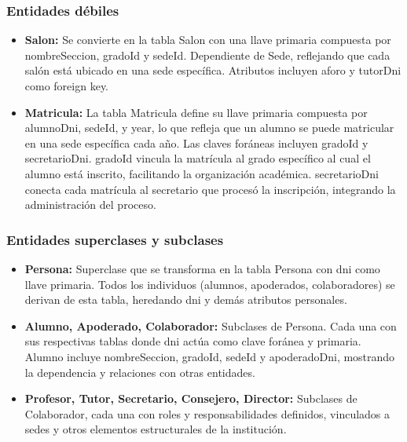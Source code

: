 \subsubsection{Entidades débiles}
\begin{itemize}
	\item \textbf{Salon:} Se convierte en la tabla Salon con una llave primaria compuesta por nombreSeccion, gradoId y sedeId. Dependiente de Sede, reflejando que cada salón está ubicado en una sede específica. Atributos incluyen aforo y tutorDni como foreign key.
	\item \textbf{Matricula:} La tabla Matricula define su llave primaria compuesta por alumnoDni, sedeId, y year, lo que refleja que un alumno se puede matricular en una sede específica cada año. Las claves foráneas incluyen gradoId y secretarioDni. gradoId vincula la matrícula al grado específico al cual el alumno está inscrito, facilitando la organización académica. secretarioDni conecta cada matrícula al secretario que procesó la inscripción, integrando la administración del proceso.
\end{itemize}
\subsubsection{Entidades superclases y subclases}
\begin{itemize}
	\item \textbf{Persona:} Superclase que se transforma en la tabla Persona con dni como llave primaria. Todos los individuos (alumnos, apoderados, colaboradores) se derivan de esta tabla, heredando dni y demás atributos personales.
	\item \textbf{Alumno, Apoderado, Colaborador:} Subclases de Persona. Cada una con sus respectivas tablas donde dni actúa como clave foránea y primaria. Alumno incluye nombreSeccion, gradoId, sedeId y apoderadoDni, mostrando la dependencia y relaciones con otras entidades.
	\item \textbf{Profesor, Tutor, Secretario, Consejero, Director:} Subclases de Colaborador, cada una con roles y responsabilidades definidos, vinculados a sedes y otros elementos estructurales de la institución.
\end{itemize}
